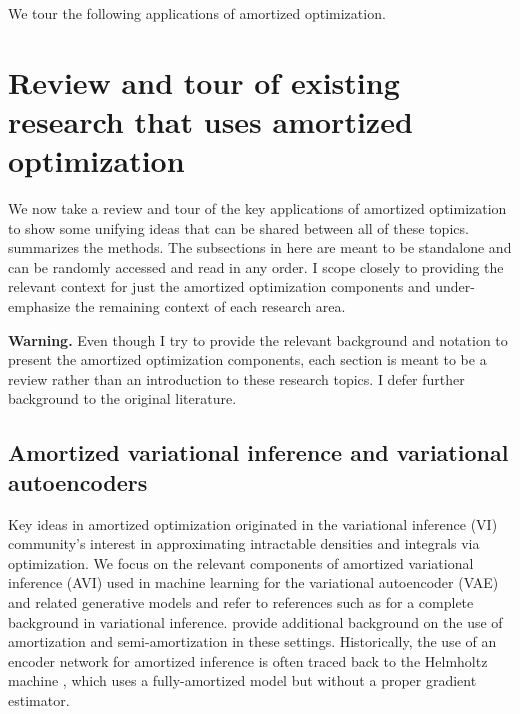 \documentclass[twoside,11pt]{article}
\begin{document}
\begin{table}[h]
  \caption{We tour the following applications of amortized optimization.}
  \vspace{3mm}
  
  \label{tab:rw}
\end{table}

\section{Review and tour of existing research that uses amortized optimization}
\label{sec:apps}
We now take a review and tour of the key applications
of amortized optimization to show some unifying ideas
that can be shared between all of these topics.
 summarizes the methods.
The subsections in here are meant to be standalone
and can be randomly accessed and read in any order.
I scope closely to providing the relevant context for
just the amortized optimization components and
under-emphasize the remaining context of each research area.

\textbf{Warning.}
Even though I try to provide the relevant background and notation to
present the amortized optimization components, each section is
meant to be a review rather than an introduction to
these research topics.
I defer further background to the original literature.

\subsection{Amortized variational inference and
  variational autoencoders}
\label{sec:apps:avi}
Key ideas in amortized optimization originated in the
variational inference (VI) community's interest in
approximating intractable densities and integrals
via optimization.
We focus on the relevant components of amortized
variational inference (AVI) used in machine learning
for the variational autoencoder (VAE) and
related generative models
\citep{kingma2013auto,rezende2014stochastic,mnih2014neural,rezende2015variational,higgins2016beta,doersch2016tutorial,kingma2019introduction}
and refer to references such as
\citet{jordan1999introduction,wainwright2008graphical,blei2017variational}
for a complete background in variational inference.
\citet{kim2020deep,marino2021learned} provide additional background
on the use of amortization and semi-amortization in these settings.
Historically, the use of an encoder network for amortized inference
is often traced back to the Helmholtz machine \citep{dayan1995helmholtz},
which uses a fully-amortized model but without a proper gradient estimator.
\end{document}
